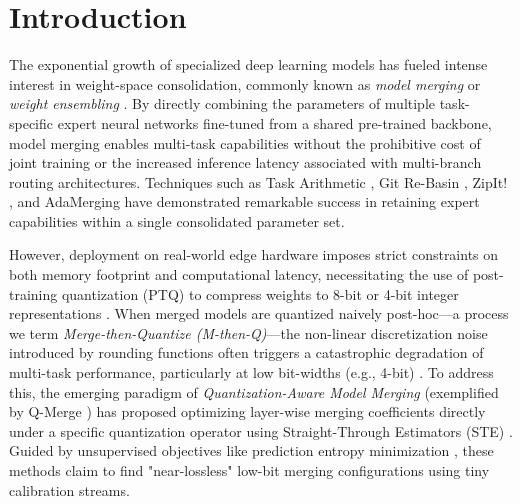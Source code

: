 \section{Introduction}
\label{submission:sec:intro}

The exponential growth of specialized deep learning models has fueled intense interest in weight-space consolidation, commonly known as \emph{model merging} or \emph{weight ensembling} \cite{wortsman2022model, ilharco2022editing}. By directly combining the parameters of multiple task-specific expert neural networks fine-tuned from a shared pre-trained backbone, model merging enables multi-task capabilities without the prohibitive cost of joint training or the increased inference latency associated with multi-branch routing architectures. Techniques such as Task Arithmetic \cite{ilharco2022editing}, Git Re-Basin \cite{ainsworth2022git}, ZipIt! \cite{stoica2023zipit}, and AdaMerging \cite{yang2023adamerging} have demonstrated remarkable success in retaining expert capabilities within a single consolidated parameter set.

However, deployment on real-world edge hardware imposes strict constraints on both memory footprint and computational latency, necessitating the use of post-training quantization (PTQ) to compress weights to 8-bit or 4-bit integer representations \cite{nagel2021whitepaper}. When merged models are quantized naively post-hoc---a process we term \emph{Merge-then-Quantize (M-then-Q)}---the non-linear discretization noise introduced by rounding functions often triggers a catastrophic degradation of multi-task performance, particularly at low bit-widths (e.g., 4-bit) \cite{qmerge2025}. To address this, the emerging paradigm of \emph{Quantization-Aware Model Merging} (exemplified by Q-Merge \cite{qmerge2025}) has proposed optimizing layer-wise merging coefficients directly under a specific quantization operator using Straight-Through Estimators (STE) \cite{bengio2013ste}. Guided by unsupervised objectives like prediction entropy minimization \cite{wang2020tent}, these methods claim to find "near-lossless" low-bit merging configurations using tiny calibration streams.

